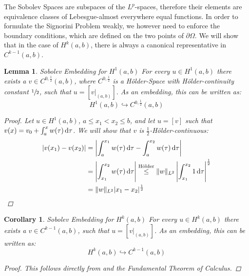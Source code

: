 \documentclass[headsepline,footsepline,footinclude=false,oneside,fontsize=11pt,paper=a4,listof=totoc,bibliography=totoc]{scrbook} %
\newtheorem{lemma}{Lemma}
\newtheorem{corollary}{Corollary}
\begin{document}
The Sobolev Spaces are subspaces of the $L^p$-spaces, therefore their elements are equivalence classes of Lebesgue-almost everywhere equal functions. In order to formulate the Signorini Problem weakly, we however need to enforce the boundary conditions, which are defined on the two points of $\partial \Omega$. We will show that in the case of $H^k(a,b)$, there is always a canonical representative in $C^{k-1}(a,b)$.


\begin{lemma} Sobolev Embedding for $H^1(a,b)$ \newline
	For every $u \in H^1(a,b)$ there exists a $v \in C^{0,\frac{1}{2}}(a,b)$, where $C^{0,\frac{1}{2}}$ is a Hölder-Space with Hölder-continuity constant $\sfrac{1}{2}$, such that $u = [v \vert_{(a,b)}]$. As an embedding, this can be written as:
	\begin{equation} \label{eq:sobolev1_embedding}
	H^1(a,b) \hookrightarrow C^{0,\frac{1}{2}}(a,b)
	\end{equation}
	\begin{proof}
	Let $u \in H^1(a,b)$, $a \leq x_1 < x_2 \leq b$, and let $u = [v]$ such that $v(x) = v_0 + \int_a^x w(\tau) \dif \tau$. We will show that $v$ is $\frac{1}{2}$-Hölder-continuous:
	\begin{align*}
	\vert v(x_1) - v(x_2) \vert &= \left\vert \int_{a}^{x_1} w(\tau) \dif \tau - \int_{a}^{x_2} w(\tau) \dif \tau \right\vert \\
	&= \left\vert \int_{x_1}^{x_2} w(\tau) \dif \tau \right\vert \overset{\textnormal{Hölder}}{\leq} \Vert w \Vert_{L^2} \left\vert \int_{x_1}^{x_2} 1 \dif \tau \right\vert ^{\frac{1}{2}} \\
	& = \Vert w \Vert_{L^2} \vert x_1 - x_2 \vert ^{\frac{1}{2}}
	\end{align*}
	\end{proof}
\end{lemma}

\begin{corollary} Sobolev Embedding for $H^k(a,b)$ \newline
		For every $u \in H^k(a,b)$ there exists a $v \in C^{k-1}(a,b)$, such that $u = [v \vert_{(a,b)}]$. As an embedding, this can be written as:
	\begin{equation}
	H^k(a,b) \hookrightarrow C^{k-1}(a,b)
	\end{equation}
	\begin{proof}
		This follows directly from  and the Fundamental Theorem of Calculus.
	\end{proof}
\end{corollary}
	
\end{document}
